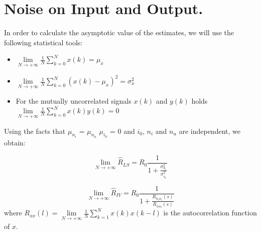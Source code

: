 \part{Noise on Input and Output.}
In order to calculate the asymptotic value of the estimates, we will use the following statistical tools:
\begin{itemize}
    \item $\lim\limits_{N \rightarrow +\infty} \frac{1}{N} \sum_{k=0}^N x(k) = \mu_x $
    \item $\lim\limits_{N \rightarrow +\infty} \frac{1}{N} \sum_{k=0}^N (x(k) - \mu_x)^2 = \sigma_x^2 $
    \item For the mutually uncorrelated signals $x(k)$ and $y(k)$ holds $\lim\limits_{N \rightarrow +\infty} \frac{1}{N} \sum_{k=0}^N x(k) y(k) = 0 $
\end{itemize}

Using the facts that $\mu_{n_i}$ = $\mu_{n_u}$ $\mu_{i_0}$ = 0 and $i_0$, $n_i$ and $n_u$ are independent, we obtain: 

\begin{equation}\label{as_val_LS}
    \lim\limits_{N \rightarrow +\infty} \hat{R}_{LS} = R_0 \frac{1}{1+\frac{\sigma_{n_i}^2}{\sigma_{i_0}^2}}
\end{equation}

\begin{equation}\label{as_val_IV}
        \lim\limits_{N \rightarrow +\infty} \hat{R}_{IV} = R_0 \frac{1}{1+\frac{R_{n_i n_i}(s)}{R_{i_0 i_0}(s)}}
\end{equation}
where $R_{x x}(l) = \lim\limits_{N \rightarrow +\infty} \frac{1}{N} \sum_{k=1}^N x(k) x(k-l)$ is the autocorrelation function of $x$.
